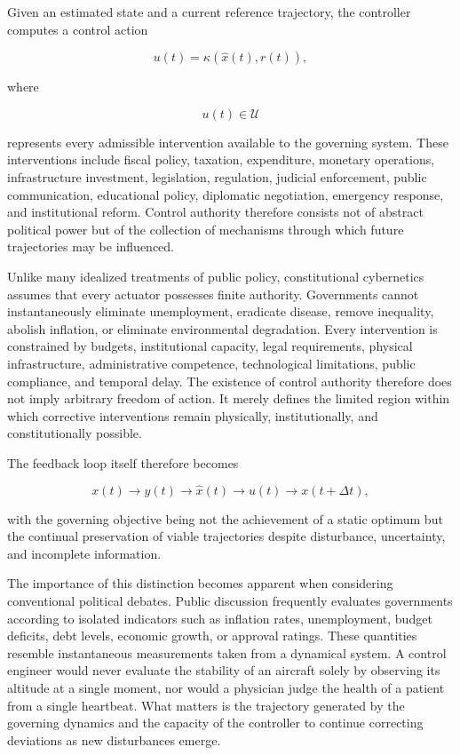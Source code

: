 \documentclass[12pt,a4paper]{article}
\begin{document}
Given an estimated state and a current reference trajectory, the controller computes a control action

\[
u(t)
=
\kappa
\left(
\hat{x}(t),
r(t)
\right),
\]

where

\[
u(t)\in\mathcal{U}
\]

represents every admissible intervention available to the governing system. These interventions include fiscal policy, taxation, expenditure, monetary operations, infrastructure investment, legislation, regulation, judicial enforcement, public communication, educational policy, diplomatic negotiation, emergency response, and institutional reform. Control authority therefore consists not of abstract political power but of the collection of mechanisms through which future trajectories may be influenced.

Unlike many idealized treatments of public policy, constitutional cybernetics assumes that every actuator possesses finite authority. Governments cannot instantaneously eliminate unemployment, eradicate disease, remove inequality, abolish inflation, or eliminate environmental degradation. Every intervention is constrained by budgets, institutional capacity, legal requirements, physical infrastructure, administrative competence, technological limitations, public compliance, and temporal delay. The existence of control authority therefore does not imply arbitrary freedom of action. It merely defines the limited region within which corrective interventions remain physically, institutionally, and constitutionally possible.

The feedback loop itself therefore becomes

\[
x(t)
\rightarrow
y(t)
\rightarrow
\hat{x}(t)
\rightarrow
u(t)
\rightarrow
x(t+\Delta t),
\]

with the governing objective being not the achievement of a static optimum but the continual preservation of viable trajectories despite disturbance, uncertainty, and incomplete information.

The importance of this distinction becomes apparent when considering conventional political debates. Public discussion frequently evaluates governments according to isolated indicators such as inflation rates, unemployment, budget deficits, debt levels, economic growth, or approval ratings. These quantities resemble instantaneous measurements taken from a dynamical system. A control engineer would never evaluate the stability of an aircraft solely by observing its altitude at a single moment, nor would a physician judge the health of a patient from a single heartbeat. What matters is the trajectory generated by the governing dynamics and the capacity of the controller to continue correcting deviations as new disturbances emerge.
\end{document}
